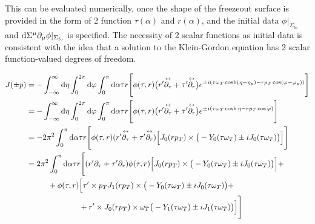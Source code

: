 This can be evaluated numerically, once the shape of the freezeout surface is provided in the form of 2 function $\tau(\alpha)$ and $r(\alpha)$, and the initial data ${\phi\vert_{\Sigma_{\text{fo}}}}$ and ${\text{d}\Sigma^\mu\partial_\mu\phi\vert_{\Sigma_{\text{fo}}}}$ is specified. The necessity of 2 scalar functions as initial data is consistent with the idea that a solution to the Klein-Gordon equation has 2 scalar function-valued degrees of freedom.

\begin{subequations}
    \begin{align}
        J(\pm p) & =-\int_{-\infty}^\infty\text{d}\eta\int_0^{2\pi}\text{d}\varphi\int_0^\pi\text{d}\alpha\tau r\Bigg[\phi(\tau,r)\big(r^\prime\overset{\leftrightarrow}{\partial_\tau}+\tau^\prime\overset{\leftrightarrow}{\partial_r}\big)e^{\pm{i}(\tau \omega_T\cosh(\eta-\eta_p)-r p_T\cos(\varphi-\varphi_p))}\Bigg] \\
                           & =-\int_{-\infty}^\infty\text{d}\eta\int_0^{2\pi}\text{d}\varphi\int_0^\pi\text{d}\alpha\tau r\Bigg[\phi(\tau,r)\big(r^\prime\overset{\leftrightarrow}{\partial_\tau}+\tau^\prime\overset{\leftrightarrow}{\partial_r}\big)e^{\pm{i}(\tau \omega_T\cosh\eta-r p_T\cos\varphi)}\Bigg]                      \\
                           & =-2\pi^2\int_0^\pi\text{d}\alpha\tau r\Bigg[\phi(\tau,r)(r^\prime\overset{\leftrightarrow}{\partial_\tau}+\tau^\prime\overset{\leftrightarrow}{\partial_r})\Big[J_0(r p_T)\times\big(-Y_0(\tau\omega_T)\pm{i} J_0(\tau\omega_T)\big)\Big]\Bigg]                                                 \\
                           & =2\pi^2\int_0^\pi\text{d}\alpha\tau r\Bigg[(r^\prime\partial_\tau+\tau^\prime\partial_r)\phi(\tau,r)\Big[J_0(r p_T)\times\big(-Y_0(\tau\omega_T)\pm{i} J_0(\tau\omega_T)\big)\Big]+\nonumber                                                                                             \\
                           & \phantom{=}\qquad + \phi(\tau,r)\Big[\tau^\prime\times p_T J_1(r p_T)\times\big(-Y_0(\tau\omega_T)\pm{i} J_0(\tau\omega_T)\big)+\nonumber                                                                                                                                       \\
                           & \phantom{=}\qquad\phantom{+\phi(\tau,r)\Big[}+r^\prime\times J_0(r p_T)\times\omega_T\big(-Y_1(\tau\omega_T)\pm{i} J_1(\tau\omega_T)\big)\Big]\Bigg]
    \end{align}
\end{subequations}

